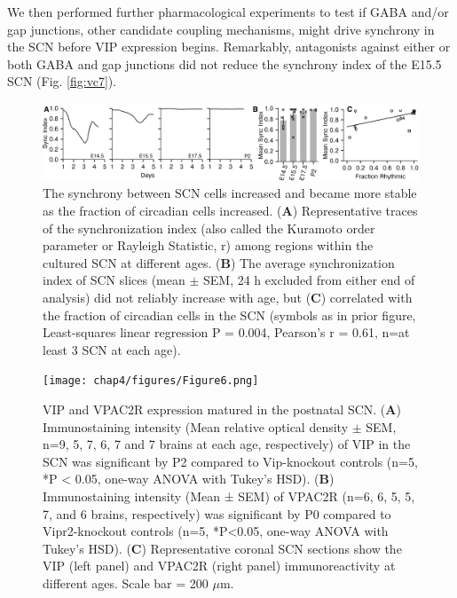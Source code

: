 We then performed further pharmacological experiments to test if GABA and/or gap junctions, other candidate coupling mechanisms, might drive synchrony in the SCN before VIP expression begins. 
Remarkably, antagonists against either or both GABA and gap junctions did not reduce the synchrony index of the E15.5 SCN (Fig. \ref{fig:vc7}).


\begin{figure}[!p]
    \begin{center}
        \includegraphics[width=6.5in]{chap4/figures/Figure5.png}
    \end{center}
    \caption{\label{fig:vc5} The synchrony between SCN cells increased and became more stable as the fraction of circadian cells increased. (\textbf{A}) Representative traces of the synchronization index (also called the Kuramoto order parameter or Rayleigh Statistic, r) among regions within the cultured SCN at different ages. (\textbf{B}) The average synchronization index of SCN slices (mean $\pm$ SEM, 24 h excluded from either end of analysis) did not reliably increase with age, but (\textbf{C}) correlated with the fraction of circadian cells in the SCN (symbols as in prior figure, Least-squares linear regression P = 0.004, Pearson's r = 0.61, n=at least 3 SCN at each age).
    }
\end{figure}

\begin{figure}[!p]
    \begin{center}
        \texttt{[image: chap4/figures/Figure6.png]}
    \end{center}
    \caption{\label{fig:vc6} VIP and VPAC2R expression matured in the postnatal SCN. (\textbf{A}) Immunostaining intensity (Mean relative optical density $\pm$ SEM, n=9, 5, 7, 6, 7 and 7 brains at each age, respectively) of VIP in the SCN was significant by P2 compared to Vip-knockout controls (n=5, *P < 0.05, one-way ANOVA with Tukey’s HSD). (\textbf{B}) Immunostaining intensity (Mean ± SEM) of VPAC2R (n=6, 6, 5, 5, 7, and 6 brains, respectively) was significant by P0 compared to Vipr2-knockout controls (n=5, *P<0.05, one-way ANOVA with Tukey’s HSD). (\textbf{C})  Representative coronal SCN sections show the VIP (left panel) and VPAC2R (right panel) immunoreactivity at different ages. Scale bar = 200 $\mu$m.
    }
\end{figure}


